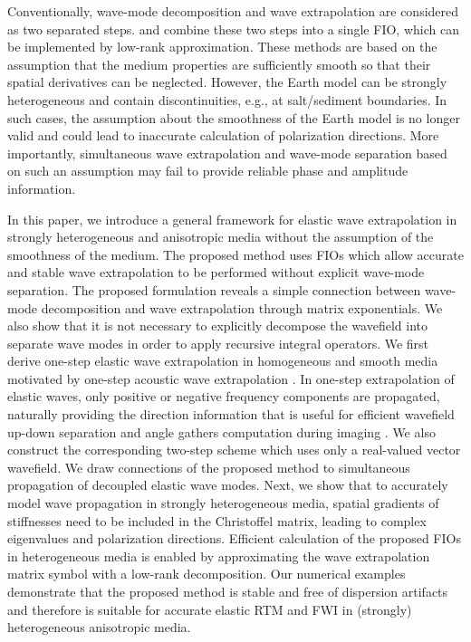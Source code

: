 Conventionally, wave-mode decomposition and wave extrapolation are considered as two separated steps. \cite{hou14} and \cite{cheng14,cheng16} combine these two steps into a single FIO, which can be implemented by low-rank approximation. These methods are based on the assumption that the medium properties are sufficiently smooth so that their spatial derivatives can be neglected. However, the Earth model can be strongly heterogeneous and contain discontinuities, e.g., at salt/sediment boundaries. In such cases, the assumption about the smoothness of the Earth model is no longer valid and could lead to inaccurate calculation of polarization directions. More importantly, simultaneous wave extrapolation and wave-mode separation based on such an assumption may fail to provide reliable phase and amplitude information.

In this paper, we introduce a general framework for elastic wave extrapolation in strongly heterogeneous and anisotropic media without the assumption of the smoothness of the medium. The proposed method uses FIOs which allow accurate and stable wave extrapolation to be performed without explicit wave-mode separation. The proposed formulation reveals a simple connection between wave-mode decomposition and wave extrapolation through matrix exponentials. We also show that it is not necessary to explicitly decompose the wavefield into separate wave modes in order to apply recursive integral operators. We first derive one-step elastic wave extrapolation in homogeneous and smooth media motivated by one-step acoustic wave extrapolation \cite[]{zhang09,sun16}. In one-step extrapolation of elastic waves, only positive or negative frequency components are propagated, naturally providing the direction information that is useful for efficient wavefield up-down separation and angle gathers computation during imaging \cite[]{shen15,hu16,sun16}. We also construct the corresponding two-step scheme which uses only a real-valued vector wavefield. We draw connections of the proposed method to simultaneous propagation of decoupled elastic wave modes. Next, we show that to accurately model wave propagation in strongly heterogeneous media, spatial gradients of stiffnesses need to be included in the Christoffel matrix, leading to complex eigenvalues and polarization directions. Efficient calculation of the proposed FIOs in heterogeneous media is enabled by approximating the wave extrapolation matrix symbol with a low-rank decomposition. Our numerical examples demonstrate that the proposed method is stable and free of dispersion artifacts and therefore is suitable for accurate elastic RTM and FWI in (strongly) heterogeneous anisotropic media.

